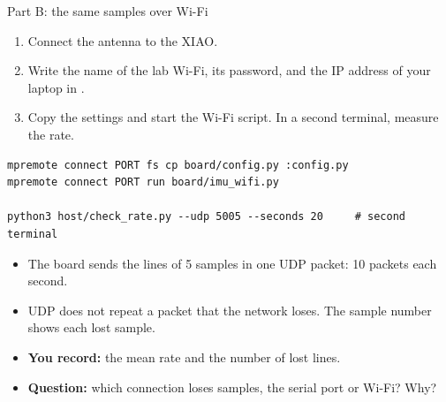 \begin{frame}[fragile]{Part B: the same samples over Wi-Fi}
  \small
  \begin{enumerate}
    \item Connect the antenna to the XIAO.
    \item Write the name of the lab Wi-Fi, its password, and the IP address
          of your laptop in .
    \item Copy the settings and start the Wi-Fi script. In a second
          terminal, measure the rate.
  \end{enumerate}
\begin{lstlisting}[style=shell]
mpremote connect PORT fs cp board/config.py :config.py
mpremote connect PORT run board/imu_wifi.py

python3 host/check_rate.py --udp 5005 --seconds 20     # second terminal
\end{lstlisting}
  \begin{itemize}
    \item The board sends the lines of 5 samples in one UDP packet: 10
          packets each second.
    \item UDP does not repeat a packet that the network loses. The sample
          number shows each lost sample.
    \item \textbf{You record:} the mean rate and the number of lost lines.
    \item \textbf{Question:} which connection loses samples, the serial
          port or Wi-Fi? Why?
  \end{itemize}
\end{frame}

